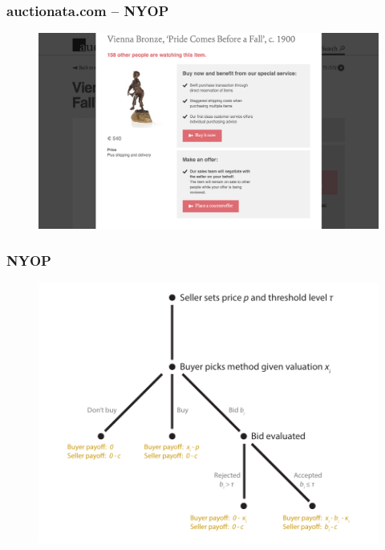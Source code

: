 \documentclass[mathserif,serif]{beamer}
\begin{document}
	\begin{frame}
		\frametitle{auctionata.com -- NYOP}
		\begin{figure}[plain]
			\hspace*{-11mm}
			\includegraphics[width=1\paperwidth]{Figures/Auctionata_options.jpg}
		\end{figure}
	\end{frame}
	
	\begin{frame}
		\frametitle{NYOP}
		\begin{figure}[plain]
			\includegraphics[width=1\textwidth]{Figures/NYOP}
		\end{figure}
	\end{frame}
	
\end{document}
